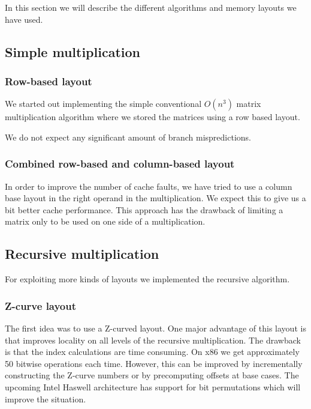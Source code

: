 In this section we will describe the different algorithms and memory
layouts we have used.

\subsection{Simple multiplication}

\subsubsection{Row-based layout}
We started out implementing the simple conventional $O(n^3)$ matrix
multiplication algorithm where we stored the matrices using a row
based layout.


We do not expect any significant amount of branch mispredictions.

\subsubsection{Combined row-based and column-based layout}

In order to improve the number of cache faults, we have tried to use a
column base layout in the right operand in the multiplication. We
expect this to give us a bit better cache performance. This approach
has the drawback of limiting a matrix only to be used on one side of a
multiplication.

\subsection{Recursive multiplication}

For exploiting more kinds of layouts we implemented the recursive algorithm.

\subsubsection{Z-curve layout}

The first idea was to use a Z-curved layout. One major advantage of this layout is that improves locality on all levels of the recursive multiplication. The drawback is that the index calculations are time consuming. On x86 we get approximately 50 bitwise operations each time. However, this can be improved by incrementally constructing the Z-curve numbers or by precomputing offsets at base cases. The upcoming Intel Haswell architecture has support for bit permutations which will improve the situation.

